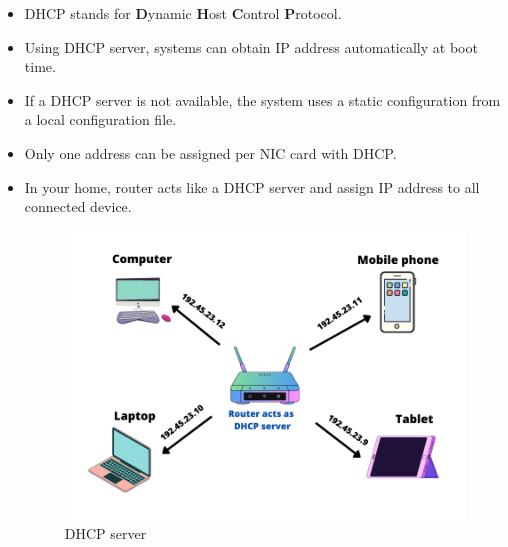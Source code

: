 \setlength{\columnsep}{3pt}
\begin{flushleft}
	\bigskip
	\begin{itemize}
		\begin{itemize}
			\item DHCP stands for \textbf{D}ynamic \textbf{H}ost \textbf{C}ontrol \textbf{P}rotocol.
			\item Using DHCP server, systems can obtain IP address automatically at boot time.
			\item If a DHCP server is not available, the system uses a static configuration from a local configuration file.
			\item Only one address can be assigned per NIC card with DHCP. 
			\item In your home, router acts like a DHCP server and assign IP address to all connected device.
			\begin{figure}[h!]
				\centering
				\includegraphics[scale=0.5]{content/chapter14/images/dhcp.png}
				\caption{DHCP server}
				\label{fig:severity6}
			\end{figure}			
		\end{itemize}
	\end{itemize}
	
 \end{flushleft}
\newpage


